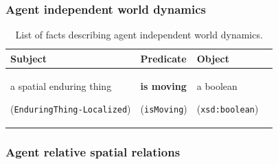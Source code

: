\documentclass{svmult}
\newcommand{\concept}[1]{{\footnotesize \texttt{#1}}}
\begin{document}
\subsubsection{Agent independent world dynamics}
\begin{table}[h]
   \centering
   \begin{tabular}{p{2cm}p{5cm}p{2cm}l}
	\rowcolor{white}

	\textbf{Subject} & \textbf{Predicate} & \textbf{Object} \\ 
	\hline
	 a spatial enduring thing \par (\concept{EnduringThing-Localized})  & \textbf{is moving} \par (\concept{isMoving})  &  a boolean \par (\concept{xsd:boolean})  
	\end{tabular}
   \caption{List of facts describing agent independent world dynamics.}
\end{table}


\subsubsection{Agent relative spatial relations}
\end{document}
